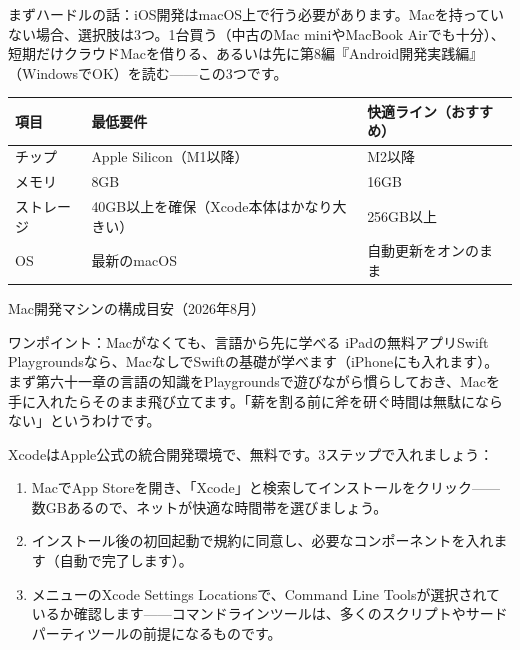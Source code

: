 


まずハードルの話：iOS開発はmacOS上で行う必要があります。Macを持っていない場合、選択肢は3つ。1台買う（中古のMac miniやMacBook Airでも十分）、短期だけクラウドMacを借りる、あるいは先に第8編『Android開発実践編』（WindowsでOK）を読む——この3つです。

\begin{center}
\begin{tabularx}{\linewidth}{|X|X|X|}
\hline
\textbf{項目} & \textbf{最低要件} & \textbf{快適ライン（おすすめ）} \tabularnewline
\hline
チップ & Apple Silicon（M1以降） & M2以降 \tabularnewline
メモリ & 8GB & 16GB \tabularnewline
ストレージ & 40GB以上を確保（Xcode本体はかなり大きい） & 256GB以上 \tabularnewline
OS & 最新のmacOS & 自動更新をオンのまま \tabularnewline
\hline
\end{tabularx}
\end{center}

\begin{center}\small\color{gray}Mac開発マシンの構成目安（2026年8月）\end{center}

\begin{tcbinfo}{ワンポイント：Macがなくても、言語から先に学べる}
iPadの無料アプリSwift Playgroundsなら、MacなしでSwiftの基礎が学べます（iPhoneにも入れます）。まず第六十一章の言語の知識をPlaygroundsで遊びながら慣らしておき、Macを手に入れたらそのまま飛び立てます。「薪を割る前に斧を研ぐ時間は無駄にならない」というわけです。

\end{tcbinfo}


XcodeはApple公式の統合開発環境で、無料です。3ステップで入れましょう：

\begin{enumerate}
  \item MacでApp Storeを開き、「Xcode」と検索してインストールをクリック——数GBあるので、ネットが快適な時間帯を選びましょう。
  \item インストール後の初回起動で規約に同意し、必要なコンポーネントを入れます（自動で完了します）。
  \item メニューのXcode Settings Locationsで、Command Line Toolsが選択されているか確認します——コマンドラインツールは、多くのスクリプトやサードパーティツールの前提になるものです。
\end{enumerate}

